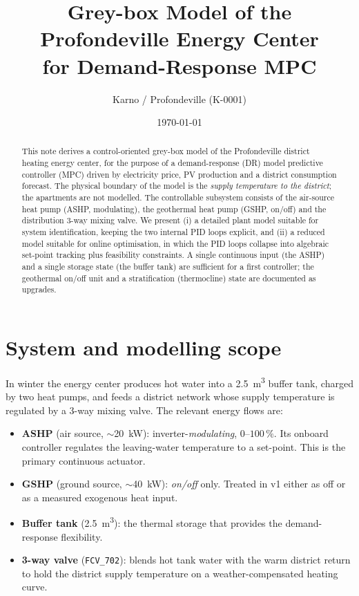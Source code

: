 \documentclass[11pt,a4paper]{article}
\title{\textbf{Grey-box Model of the Profondeville Energy Center\\for Demand-Response MPC}}
\author{Karno / Profondeville (K-0001)}
\date{\today}
\newcommand{\code}[1]{\texttt{#1}}
\begin{document}
\maketitle

\begin{abstract}
This note derives a control-oriented grey-box model of the Profondeville district
heating energy center, for the purpose of a demand-response (DR) model predictive
controller (MPC) driven by electricity price, PV production and a district
consumption forecast. The physical boundary of the model is the \emph{supply
temperature to the district}; the apartments are not modelled. The controllable
subsystem consists of the air-source heat pump (ASHP, modulating), the geothermal
heat pump (GSHP, on/off) and the distribution 3-way mixing valve. We present (i) a
detailed plant model suitable for system identification, keeping the two internal
PID loops explicit, and (ii) a reduced model suitable for online optimisation, in
which the PID loops collapse into algebraic set-point tracking plus feasibility
constraints. A single continuous input (the ASHP) and a single storage state (the
buffer tank) are sufficient for a first controller; the geothermal on/off unit and
a stratification (thermocline) state are documented as upgrades.
\end{abstract}

\tableofcontents

\section{System and modelling scope}

In winter the energy center produces hot water into a \SI{2.5}{m^3} buffer tank,
charged by two heat pumps, and feeds a district network whose supply temperature is
regulated by a 3-way mixing valve. The relevant energy flows are:

\begin{itemize}[nosep]
  \item \textbf{ASHP} (air source, $\sim$\SI{20}{kW}): inverter-\emph{modulating},
        $0$--$100\,\%$. Its onboard controller regulates the leaving-water
        temperature to a set-point. This is the primary continuous actuator.
  \item \textbf{GSHP} (ground source, $\sim$\SI{40}{kW}): \emph{on/off} only.
        Treated in v1 either as off or as a measured exogenous heat input.
  \item \textbf{Buffer tank} (\SI{2.5}{m^3}): the thermal storage that provides
        the demand-response flexibility.
  \item \textbf{3-way valve} (\code{FCV\_702}): blends hot tank water with the
        warm district return to hold the district supply temperature on a
        weather-compensated heating curve.
\end{itemize}
\end{document}
